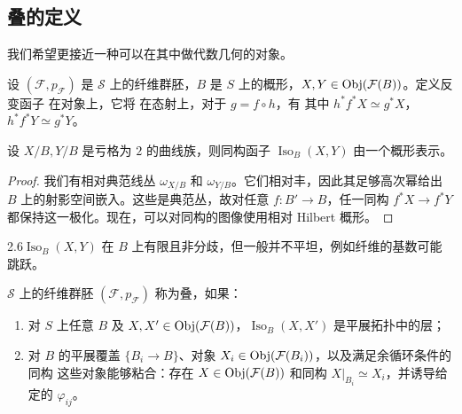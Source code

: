 \subsection{叠的定义}
我们希望更接近一种可以在其中做代数几何的对象。
\begin{definition}[同构函子]\label{def:2.4}
设 $(\mathcal F,p_{\mathcal F})$ 是 $\mathcal S$ 上的纤维群胚，$B$ 是 $S$ 上的概形，$X,Y\in\operatorname{Obj}(\mathcal F(B))$。定义反变函子
在对象上，它将
在态射上，对于 $g=f\circ h$，有
其中 $h^*f^*X\simeq g^*X$，$h^*f^*Y\simeq g^*Y$。
\end{definition}
\begin{theorem}\label{thm:2.2}
设 $X/B,Y/B$ 是亏格为 $2$ 的曲线族，则同构函子 $\operatorname{Iso}_B(X,Y)$ 由一个概形表示。
\end{theorem}
\begin{proof}
我们有相对典范线丛 $\omega_{X/B}$ 和 $\omega_{Y/B}$。它们相对丰，因此其足够高次幂给出 $B$ 上的射影空间嵌入。这些是典范丛，故对任意 $f:B'\to B$，任一同构 $f^*X\to f^*Y$ 都保持这一极化。现在，可以对同构的图像使用相对 Hilbert 概形。
\end{proof}
\begin{Note}{2.6}$\operatorname{Iso}_B(X,Y)$ 在 $B$ 上有限且非分歧，但一般并不平坦，例如纤维的基数可能跳跃。\end{Note}
\begin{definition}[叠]\label{def:2.5}
$\mathcal S$ 上的纤维群胚 $(\mathcal F,p_{\mathcal F})$ 称为叠，如果：
\begin{enumerate}
\item 对 $S$ 上任意 $B$ 及 $X,X'\in\operatorname{Obj}(\mathcal F(B))$，$\operatorname{Iso}_B(X,X')$ 是平展拓扑中的层；
\item 对 $B$ 的平展覆盖 $\{B_i\to B\}$、对象 $X_i\in\operatorname{Obj}(\mathcal F(B_i))$，以及满足余循环条件的同构
这些对象能够粘合：存在 $X\in\operatorname{Obj}(\mathcal F(B))$ 和同构 $X|_{B_i}\simeq X_i$，并诱导给定的 $\varphi_{ij}$。
\end{enumerate}
\end{definition}
